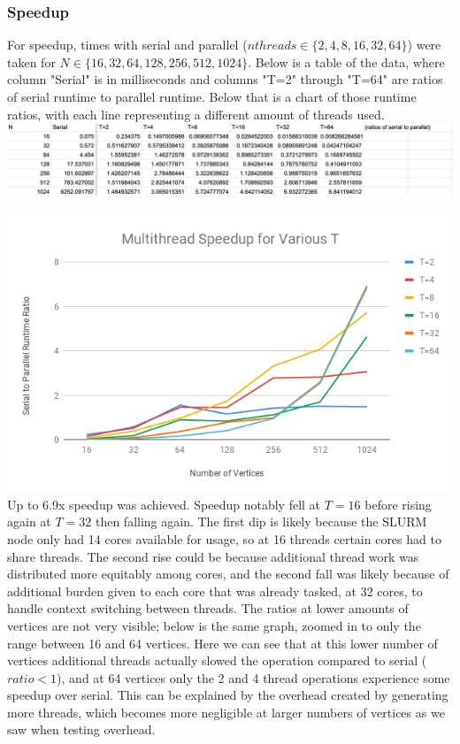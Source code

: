 \documentclass{article}
\begin{document}
\begin{adjustwidth}{-2cm}{-2cm}
\subsubsection{Speedup}
For speedup, times with serial and parallel ($nthreads \in \{2,4,8,16,32,64\}$) were taken for $N \in \{16,32,64,128,256,512,1024\}$. Below is a table of the data, where column "Serial" is in milliseconds and columns "T=2" through "T=64" are ratios of serial runtime to parallel runtime. Below that is a chart of those runtime ratios, with each line representing a different amount of threads used.\\
\includegraphics[width=\linewidth]{performancedata.png}\\
\null\\
\includegraphics[width=\linewidth]{speedup.png}\\
Up to 6.9x speedup was achieved. Speedup notably fell at $T=16$ before rising again at $T=32$ then falling again. The first dip is likely because the SLURM node only had 14 cores available for usage, so at 16 threads certain cores had to share threads. The second rise could be because additional thread work was distributed more equitably among cores, and the second fall was likely because of additional burden given to each core that was already tasked, at 32 cores, to handle context switching between threads. The ratios at lower amounts of vertices are not very visible; below is the same graph, zoomed in to only the range between 16 and 64 vertices. Here we can see that at this lower number of vertices additional threads actually slowed the operation compared to serial ($ratio < 1$), and at 64 vertices only the 2 and 4 thread operations experience some speedup over serial. This can be explained by the overhead created by generating more threads, which becomes more negligible at larger numbers of vertices as we saw when testing overhead.\\

\end{adjustwidth}
\end{document}
